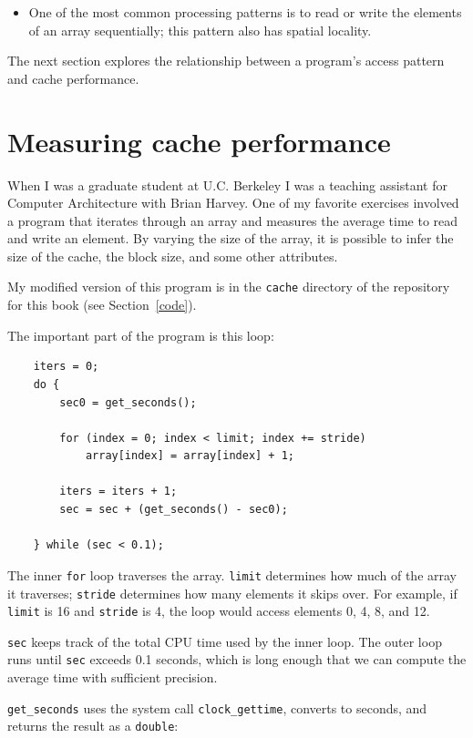 \documentclass[12pt]{book}
\begin{document}
{\begin{itemize}
\item One of the most common processing patterns is to read or write
the elements of an array sequentially; this pattern also has
spatial locality.

\end{itemize}

The next section explores the relationship
between a program's access pattern and cache performance.


\section{Measuring cache performance}

When I was a graduate student at U.C. Berkeley I was a teaching
assistant for Computer Architecture with Brian Harvey.  One of my
favorite exercises involved a program that iterates through an array
and measures the average time to read and write an element.  By
varying the size of the array, it is possible to infer the size
of the cache, the block size, and some other attributes.

My modified version of this program is in the {\tt cache} directory
of the repository for this
book (see Section~\ref{code}).

The important part of the program is this loop:

\begin{verbatim}
    iters = 0;
    do {
        sec0 = get_seconds();

        for (index = 0; index < limit; index += stride) 
            array[index] = array[index] + 1;
        
        iters = iters + 1; 
        sec = sec + (get_seconds() - sec0);
        
    } while (sec < 0.1);
\end{verbatim}

The inner {\tt for} loop traverses the array.  {\tt limit}
determines how much of the array it traverses; {\tt stride}
determines how many elements it skips over.  For example, if
{\tt limit} is 16 and {\tt stride} is 4, the loop would access
elements 0, 4, 8, and 12.

{\tt sec} keeps track of the total CPU time used by the inner loop.
The outer loop runs until {\tt sec} exceeds 0.1 seconds, which is
long enough that we can compute the average time with sufficient
precision.

\verb"get_seconds" uses the system call \verb"clock_gettime",
converts to seconds, and returns the result as a {\tt double}:

}
\end{document}
